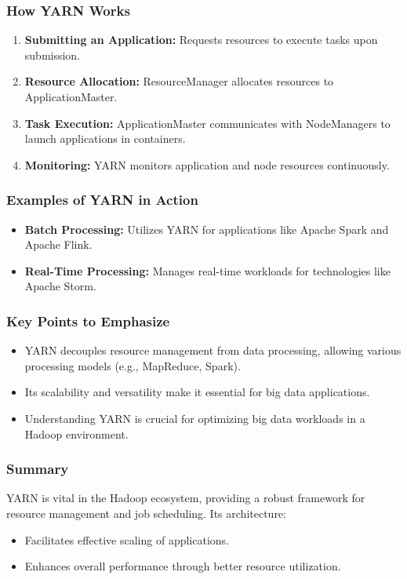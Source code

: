\documentclass[aspectratio=169]{beamer}
\begin{document}
\begin{frame}[fragile]
    \frametitle{How YARN Works}
    \begin{enumerate}
        \item \textbf{Submitting an Application:} Requests resources to execute tasks upon submission.
        \item \textbf{Resource Allocation:} ResourceManager allocates resources to ApplicationMaster.
        \item \textbf{Task Execution:} ApplicationMaster communicates with NodeManagers to launch applications in containers.
        \item \textbf{Monitoring:} YARN monitors application and node resources continuously.
    \end{enumerate}
\end{frame}

\begin{frame}[fragile]
    \frametitle{Examples of YARN in Action}
    \begin{itemize}
        \item \textbf{Batch Processing:} Utilizes YARN for applications like Apache Spark and Apache Flink.
        \item \textbf{Real-Time Processing:} Manages real-time workloads for technologies like Apache Storm.
    \end{itemize}
\end{frame}

\begin{frame}[fragile]
    \frametitle{Key Points to Emphasize}
    \begin{itemize}
        \item YARN decouples resource management from data processing, allowing various processing models (e.g., MapReduce, Spark).
        \item Its scalability and versatility make it essential for big data applications.
        \item Understanding YARN is crucial for optimizing big data workloads in a Hadoop environment.
    \end{itemize}
\end{frame}

\begin{frame}[fragile]
    \frametitle{Summary}
    YARN is vital in the Hadoop ecosystem, providing a robust framework for resource management and job scheduling. Its architecture:
    \begin{itemize}
        \item Facilitates effective scaling of applications.
        \item Enhances overall performance through better resource utilization.
    \end{itemize}
\end{frame}
\end{document}

